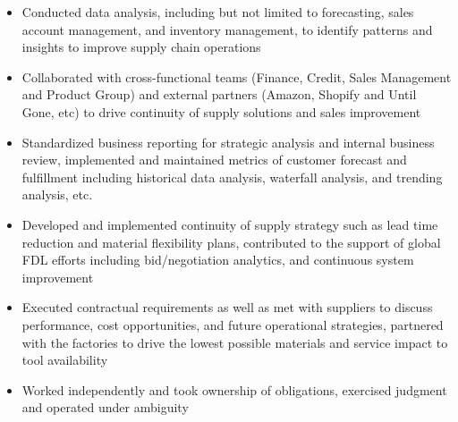 \documentclass{resume}
\begin{document}
\begin{itemize}
      \item Conducted data analysis, including but not limited to forecasting,
            sales account management, and inventory management, to identify
            patterns and
            insights to improve supply chain operations
      \item Collaborated with cross-functional teams (Finance, Credit, Sales
            Management and Product Group) and external partners (Amazon,
            Shopify
            and Until
            Gone, etc) to drive continuity of supply solutions and sales
            improvement
      \item Standardized business reporting for strategic analysis and internal
            business review, implemented and maintained metrics of customer
            forecast and
            fulfillment including historical data analysis, waterfall analysis,
            and
            trending analysis, etc.
      \item Developed and implemented continuity of supply strategy such as
            lead
            time reduction and material flexibility plans, contributed to the
            support of
            global FDL efforts including bid/negotiation analytics, and
            continuous
            system
            improvement
      \item Executed contractual requirements as well as met with suppliers to
            discuss performance, cost opportunities, and future operational
            strategies,
            partnered with the factories to drive the lowest possible materials
            and
            service
            impact to tool availability
      \item Worked independently and took ownership of obligations, exercised
            judgment and operated under ambiguity
\end{itemize}
\end{document}
